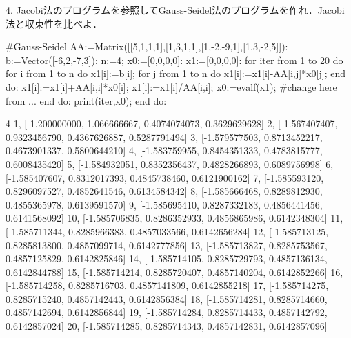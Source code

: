 4. Jacobi法のプログラムを参照してGauss-Seidel法のプログラムを作れ．Jacobi法と収束性を比べよ．
\begin{MapleInput}
#Gauss-Seidel
AA:=Matrix([[5,1,1,1],[1,3,1,1],[1,-2,-9,1],[1,3,-2,5]]):
b:=Vector([-6,2,-7,3]):
n:=4;
x0:=[0,0,0,0]:
x1:=[0,0,0,0]:
for iter from 1 to 20 do
for i from 1 to n do
  x1[i]:=b[i];
  for j from 1 to n do
    x1[i]:=x1[i]-AA[i,j]*x0[j];
  end do:
  x1[i]:=x1[i]+AA[i,i]*x0[i];
  x1[i]:=x1[i]/AA[i,i];
  x0:=evalf(x1);  #change here from ...
end do:
print(iter,x0);
end do:
\end{MapleInput}
\begin{MapleError}
                               4
   1, [-1.200000000, 1.066666667, 0.4074074073, 0.3629629628]
  2, [-1.567407407, 0.9323456790, 0.4367626887, 0.5287791494]
  3, [-1.579577503, 0.8713452217, 0.4673901337, 0.5800644210]
  4, [-1.583759955, 0.8454351333, 0.4783815777, 0.6008435420]
  5, [-1.584932051, 0.8352356437, 0.4828266893, 0.6089756998]
  6, [-1.585407607, 0.8312017393, 0.4845738460, 0.6121900162]
  7, [-1.585593120, 0.8296097527, 0.4852641546, 0.6134584342]
  8, [-1.585666468, 0.8289812930, 0.4855365978, 0.6139591570]
  9, [-1.585695410, 0.8287332183, 0.4856441456, 0.6141568092]
  10, [-1.585706835, 0.8286352933, 0.4856865986, 0.6142348304]
  11, [-1.585711344, 0.8285966383, 0.4857033566, 0.6142656284]
  12, [-1.585713125, 0.8285813800, 0.4857099714, 0.6142777856]
  13, [-1.585713827, 0.8285753567, 0.4857125829, 0.6142825846]
  14, [-1.585714105, 0.8285729793, 0.4857136134, 0.6142844788]
  15, [-1.585714214, 0.8285720407, 0.4857140204, 0.6142852266]
  16, [-1.585714258, 0.8285716703, 0.4857141809, 0.6142855218]
  17, [-1.585714275, 0.8285715240, 0.4857142443, 0.6142856384]
  18, [-1.585714281, 0.8285714660, 0.4857142694, 0.6142856844]
  19, [-1.585714284, 0.8285714433, 0.4857142792, 0.6142857024]
  20, [-1.585714285, 0.8285714343, 0.4857142831, 0.6142857096]
\end{MapleError}

